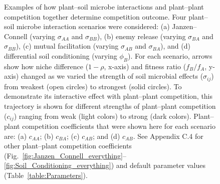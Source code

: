 \clearpage
\begin{figure}[h!]
	\centering
	\caption[Examples of how plant--soil microbe interactions and plant--plant competition together determine competition outcome.]
		{\hspace{1mm}Examples of how plant--soil microbe interactions and plant--plant competition together determine competition outcome. Four plant--soil microbe interaction scenarios were considered: (a) Janzen--Connell (varying $\sigma_{AA}$ and $\sigma_{BB}$), (b) enemy release (varying $\sigma_{BA}$ and $\sigma_{BB}$), (c) mutual facilitation (varying $\sigma_{AB}$ and  $\sigma_{BA}$), and (d) differential soil conditioning (varying $\phi_{B}$). For each scenario, arrows show how niche difference ($1 - \rho$, x-axis) and fitness ratio ($f_{B}/f_{A}$, y-axis) changed as we varied the strength of soil microbial effects ($\sigma_{ij}$) from weakest (open circles) to strongest (solid circles). To demonstrate its interactive effect with plant--plant competition, this trajectory is shown for different strengths of plant--plant competition ($c_{ij}$) ranging from weak (light colors) to strong (dark colors). Plant--plant competition coefficients that were shown here for each scenario are: (a) $c_{AA}$; (b) $c_{BA}$; (c) $c_{AB}$; and (d) $c_{AB}$. See Appendix C.4 for other plant--plant competition coefficients (Fig.~\ref{fig:Janzen_Connell_everything}--\ref{fig:Soil_Conditioning_everything}) and default parameter values (Table~\ref{table:Parameters}).}
	\label{fig:Scenario_Battleaxes}
\end{figure}



